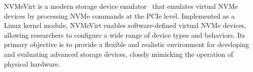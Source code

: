 \begin{comment}
There are several tools available for simulating or emulating SSDs.
Simulators use data processing models to mimic the internal operations of actual devices.
Their primary purpose is to construct models of the devices and parameterize the performance of internal operations to calculate desired performance metrics in the model.
As a result, while detailed analysis is possible, executing actual workloads can slow down the overall system when simulating the entire system.

Many emulators similar to NVMeVirt exist; for instance, FlexDrive can only emulate existing SSD types and does not support devices like KVSSDs and ZNS SSDs.
Our research aimed to reduce the time required for aging when conducting new studies, so we sought an emulator that could be used across various devices and thus did not utilize those emulators.
FEMU, on the other hand, provides a virtual NVMe device to guest operating systems by leveraging device virtualization features.
However, in a virtual machine environment, the guest physical memory is scattered across the host's physical memory through the host's virtual memory system, which can be inconvenient, and there is also the hassle of needing to reboot during experiments.

In contrast, NVMeVirt allows developers to easily modify the NVMe interface layer, enabling exploration of various design spaces and support for new device types.
Additionally, because it does not rely on virtualization technology, it permits comprehensive communication models with low overhead, and its modular design allows for easy usage through module loading.
For these reasons, we conducted our research on NVMeVirt.

Using an emulator like NVMeVirt enables direct access to the FTL, making our research feasible.
Through our research, we aim to facilitate the rapid creation of aged SSDs for future studies.
\end{comment}


NVMeVirt is a modern storage device emulator~\cite{nvmevirt} that emulates virtual NVMe devices by processing NVMe commands at the PCIe level.
Implemented as a Linux kernel module, NVMeVirt enables software-defined virtual NVMe devices, allowing researchers to configure a wide range of device types and behaviors.
Its primary objective is to provide a flexible and realistic environment for developing and evaluating advanced storage devices, closely mimicking the operation of physical hardware.

